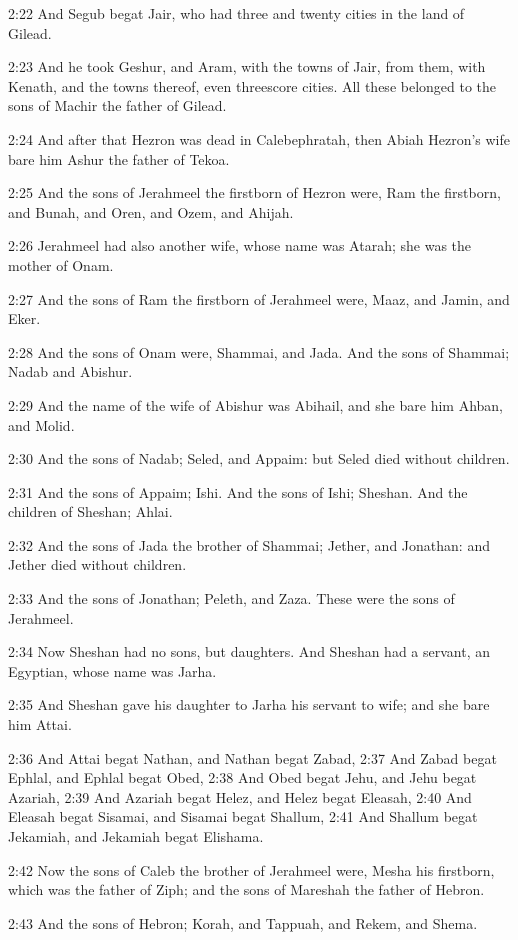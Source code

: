 2:22 And Segub begat Jair, who had three and twenty cities in the land
of Gilead.

2:23 And he took Geshur, and Aram, with the towns of Jair, from them,
with Kenath, and the towns thereof, even threescore cities. All these
belonged to the sons of Machir the father of Gilead.

2:24 And after that Hezron was dead in Calebephratah, then Abiah
Hezron's wife bare him Ashur the father of Tekoa.

2:25 And the sons of Jerahmeel the firstborn of Hezron were, Ram the
firstborn, and Bunah, and Oren, and Ozem, and Ahijah.

2:26 Jerahmeel had also another wife, whose name was Atarah; she was
the mother of Onam.

2:27 And the sons of Ram the firstborn of Jerahmeel were, Maaz, and
Jamin, and Eker.

2:28 And the sons of Onam were, Shammai, and Jada. And the sons of
Shammai; Nadab and Abishur.

2:29 And the name of the wife of Abishur was Abihail, and she bare him
Ahban, and Molid.

2:30 And the sons of Nadab; Seled, and Appaim: but Seled died without
children.

2:31 And the sons of Appaim; Ishi. And the sons of Ishi; Sheshan. And
the children of Sheshan; Ahlai.

2:32 And the sons of Jada the brother of Shammai; Jether, and
Jonathan: and Jether died without children.

2:33 And the sons of Jonathan; Peleth, and Zaza. These were the sons
of Jerahmeel.

2:34 Now Sheshan had no sons, but daughters. And Sheshan had a
servant, an Egyptian, whose name was Jarha.

2:35 And Sheshan gave his daughter to Jarha his servant to wife; and
she bare him Attai.

2:36 And Attai begat Nathan, and Nathan begat Zabad, 2:37 And Zabad
begat Ephlal, and Ephlal begat Obed, 2:38 And Obed begat Jehu, and
Jehu begat Azariah, 2:39 And Azariah begat Helez, and Helez begat
Eleasah, 2:40 And Eleasah begat Sisamai, and Sisamai begat Shallum,
2:41 And Shallum begat Jekamiah, and Jekamiah begat Elishama.

2:42 Now the sons of Caleb the brother of Jerahmeel were, Mesha his
firstborn, which was the father of Ziph; and the sons of Mareshah the
father of Hebron.

2:43 And the sons of Hebron; Korah, and Tappuah, and Rekem, and Shema.

